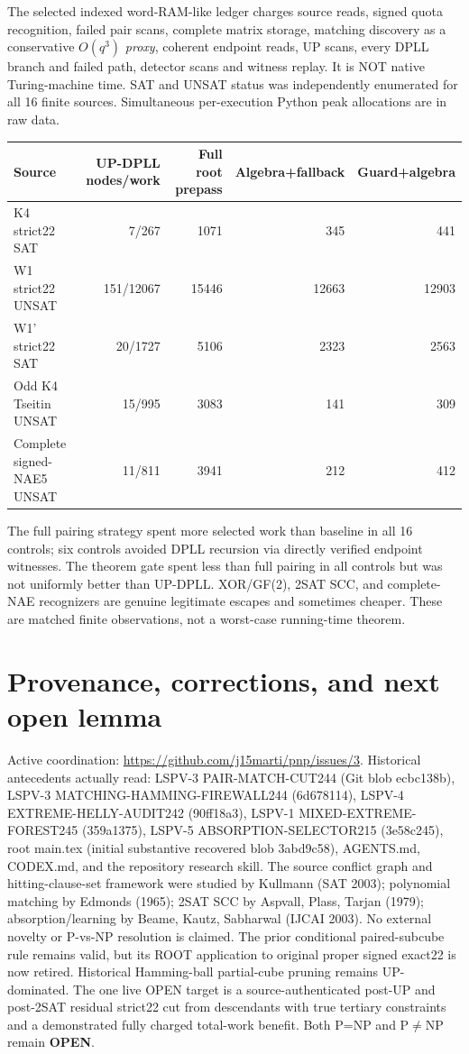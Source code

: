 \documentclass[10pt]{article}
\begin{document}
The selected indexed word-RAM-like ledger charges source reads, signed quota recognition, failed pair scans, complete matrix storage, matching discovery as a conservative $O(q^3)$ \emph{proxy}, coherent endpoint reads, UP scans, every DPLL branch and failed path, detector scans and witness replay. It is NOT native Turing-machine time. SAT and UNSAT status was independently enumerated for all 16 finite sources. Simultaneous per-execution Python peak allocations are in raw data.
\begin{center}\small\begin{tabular}{lrrrr}
\toprule
Source & UP-DPLL nodes/work & Full root prepass & Algebra+fallback & Guard+algebra \\
\midrule
K4 strict22 SAT & 7/267 &1071&345&441\\
W1 strict22 UNSAT&151/12067&15446&12663&12903\\
W1' strict22 SAT&20/1727&5106&2323&2563\\
Odd K4 Tseitin UNSAT&15/995&3083&141&309\\
Complete signed-NAE5 UNSAT&11/811&3941&212&412\\
\bottomrule\end{tabular}\end{center}
The full pairing strategy spent more selected work than baseline in all 16 controls; six controls avoided DPLL recursion via directly verified endpoint witnesses. The theorem gate spent less than full pairing in all controls but was not uniformly better than UP-DPLL. XOR/GF(2), 2SAT SCC, and complete-NAE recognizers are genuine legitimate escapes and sometimes cheaper. These are matched finite observations, not a worst-case running-time theorem.

\section{Provenance, corrections, and next open lemma}
Active coordination: \url{https://github.com/j15marti/pnp/issues/3}. Historical antecedents actually read: LSPV-3 PAIR-MATCH-CUT244 (Git blob ecbc138b), LSPV-3 MATCHING-HAMMING-FIREWALL244 (6d678114), LSPV-4 EXTREME-HELLY-AUDIT242 (90ff18a3), LSPV-1 MIXED-EXTREME-FOREST245 (359a1375), LSPV-5 ABSORPTION-SELECTOR215 (3e58c245), root main.tex (initial substantive recovered blob 3abd9c58), AGENTS.md, CODEX.md, and the repository research skill. The source conflict graph and hitting-clause-set framework were studied by Kullmann (SAT 2003); polynomial matching by Edmonds (1965); 2SAT SCC by Aspvall, Plass, Tarjan (1979); absorption/learning by Beame, Kautz, Sabharwal (IJCAI 2003). No external novelty or P-vs-NP resolution is claimed. The prior conditional paired-subcube rule remains valid, but its ROOT application to original proper signed exact22 is now retired. Historical Hamming-ball partial-cube pruning remains UP-dominated. The one live OPEN target is a source-authenticated post-UP and post-2SAT residual strict22 cut from descendants with true tertiary constraints and a demonstrated fully charged total-work benefit. Both P=NP and P$\ne$NP remain \textbf{OPEN}.
\end{document}
